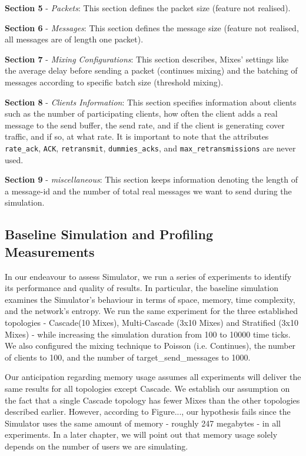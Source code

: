 \documentclass[logo,msc,cyber]{infthesis}   %
\begin{document}
\textbf{Section 5} - \emph{Packets}: This section defines the packet size
(feature not realised).

\textbf{Section 6} - \emph{Messages}: This section defines the message size
(feature not realised, all messages are of length one packet).

\textbf{Section 7} - \emph{Mixing Configurations}: This section describes, Mixes'
settings like the average delay before sending a packet (continues mixing) and
the batching of messages according to specific batch size (threshold mixing). 
    
\textbf{Section 8} - \emph{Clients Information}: This section specifies
information about clients such as the number of participating clients, how
often the client adds a real message to the send buffer, the send rate, and if
the client is generating cover traffic, and if so, at what rate. It is important
to note that the attributes \texttt{rate\_ack}, \texttt{ACK},
\texttt{retransmit}, \texttt{dummies\_acks}, and \texttt{max\_retransmissions}
are never used. 

\textbf{Section 9} - \emph{miscellaneous}: This section keeps information
denoting the length of a message-id and the number of total real messages we
want to send during the simulation.


\subsection{Baseline Simulation and Profiling Measurements}

In our endeavour to assess Simulator, we run a series of experiments to identify
its performance and quality of results. In particular, the baseline simulation
examines the Simulator's behaviour in terms of space, memory, time complexity,
and the network's entropy. We run the same experiment for the three established
topologies - Cascade(10 Mixes), Multi-Cascade (3x10 Mixes) and Stratified (3x10
Mixes) - while increasing the simulation duration from 100 to 10000 time ticks.
We also configured the mixing technique to Poisson (i.e. Continues), the number
of clients to 100, and the number of target\_send\_messages to 1000. 

Our anticipation regarding memory usage assumes all experiments will deliver the
same results for all topologies except Cascade. We establish our assumption on
the fact that a single Cascade topology has fewer Mixes than the other
topologies described earlier. However, according to Figure..., our hypothesis
fails since the Simulator uses the same amount of memory - roughly 247 megabytes
- in all experiments. In a later chapter, we will point out that memory usage solely
depends on the number of users we are simulating.
\end{document}
